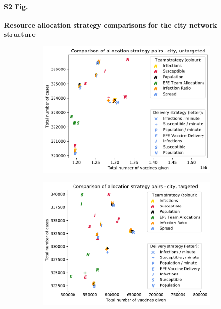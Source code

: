 \documentclass[10pt,letterpaper]{article}
\begin{document}
\paragraph*{S2 Fig.}
\label{SI:S2_fig}
{\bf Resource allocation strategy comparisons for the city network structure}
\begin{figure}[ht!]
  \begin{subfigure}[b]{0.5\textwidth}
    \includegraphics[width=\textwidth]{figures/strategies/team_vaccine_scatter_untargeted_city.pdf}
    \label{fig:strat_scatter_unt_city}
  \end{subfigure}
  \begin{subfigure}[b]{0.5\textwidth}
    \includegraphics[width=\textwidth]{figures/strategies/team_vaccine_scatter_targeted_city.pdf}
    \label{fig:strat_scatter_tar_city}
  \end{subfigure}
\end{figure}
\end{document}
